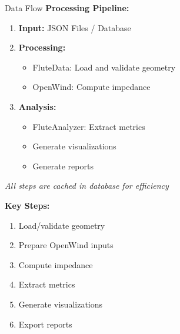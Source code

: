 \documentclass[aspectratio=169,10pt]{beamer}
\begin{document}
\begin{frame}{Data Flow}
\textbf{Processing Pipeline:}

\vspace{0.3cm}
\begin{enumerate}
    \item \textcolor{acousticblue}{\textbf{Input:}} JSON Files / Database
    \item \textcolor{acousticgreen}{\textbf{Processing:}}
    \begin{itemize}
        \item FluteData: Load and validate geometry
        \item OpenWind: Compute impedance
    \end{itemize}
    \item \textcolor{acousticorange}{\textbf{Analysis:}}
    \begin{itemize}
        \item FluteAnalyzer: Extract metrics
        \item Generate visualizations
        \item Generate reports
    \end{itemize}
\end{enumerate}

\vspace{0.3cm}
\begin{center}
\textit{All steps are cached in database for efficiency}
\end{center}

\textbf{Key Steps:}
\begin{enumerate}
    \item Load/validate geometry
    \item Prepare OpenWind inputs
    \item Compute impedance
    \item Extract metrics
    \item Generate visualizations
    \item Export reports
\end{enumerate}
\end{frame}
\end{document}
